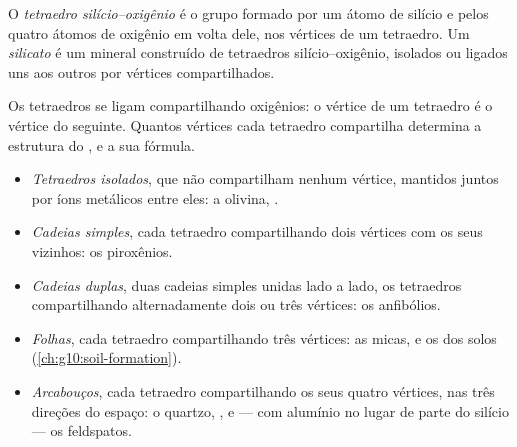 \begin{definition}\label{def:g11:minerals:silicate}
O \emph{tetraedro silício--oxigênio} é
o grupo  formado por um átomo de silício e pelos quatro átomos de
oxigênio em volta dele, nos vértices de um tetraedro. Um
\emph{silicato} é um mineral construído de tetraedros
silício--oxigênio, isolados ou ligados uns aos outros por vértices
compartilhados.
\end{definition}

Os tetraedros se ligam compartilhando oxigênios: o vértice de um tetraedro é
o vértice do seguinte. Quantos vértices cada tetraedro compartilha determina
a estrutura do , e a sua fórmula.
\begin{itemize}
  \item \emph{Tetraedros isolados}, que não compartilham nenhum vértice,
        mantidos juntos por íons metálicos entre eles: a olivina,
        .
  \item \emph{Cadeias simples}, cada tetraedro compartilhando dois vértices
        com os seus vizinhos: os piroxênios.
  \item \emph{Cadeias duplas}, duas cadeias simples unidas lado a lado, os
        tetraedros compartilhando alternadamente dois ou três vértices: os
        anfibólios.
  \item \emph{Folhas}, cada tetraedro compartilhando três vértices: as
        micas, e os  dos solos (\cref{ch:g10:soil-formation}).
  \item \emph{Arcabouços}, cada tetraedro compartilhando os seus quatro
        vértices, nas três direções do espaço: o quartzo, , e --- com
        alumínio no lugar de parte do silício --- os feldspatos.
\end{itemize}

